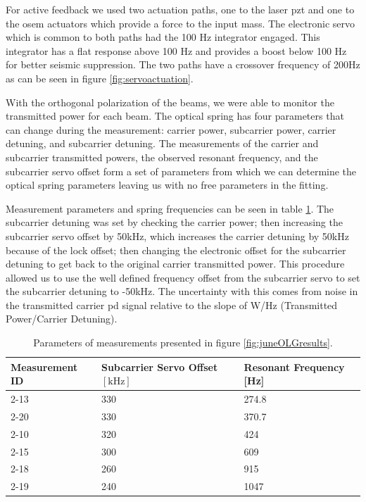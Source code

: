 For active feedback we used two actuation paths, one to the laser \ac{pzt} and
one to the \ac{osem} actuators which provide a force to the input mass.
The electronic servo which is common to both paths had the 100 Hz integrator
engaged.
This integrator has a flat response above 100 Hz and provides a boost below
100 Hz for better seismic suppression.
The two paths have a crossover frequency of 200Hz as can be seen in figure
\ref{fig:servoactuation}.


With the orthogonal polarization of the beams, we were able to monitor the
transmitted power for each beam.
The optical spring has four parameters that can change during the
measurement: carrier power, subcarrier power, carrier detuning, and subcarrier
detuning. The measurements of the carrier and subcarrier transmitted powers,
the observed resonant frequency, and the subcarrier servo offset form a set
of parameters from which we can determine the optical spring parameters leaving
us with no free parameters in the fitting.

Measurement parameters and spring frequencies can be seen in table
\ref{tab:experiment2params}.
The subcarrier detuning was set by checking the carrier power; then increasing
the subcarrier servo offset by 50kHz, which increases the carrier detuning by
50kHz because of the lock offset;
then changing the electronic offset for the subcarrier detuning to get back to
the original carrier transmitted power.
This procedure allowed us to use the well defined frequency offset from the
subcarrier servo to set the subcarrier detuning to -50kHz. The uncertainty
with this comes from noise in the transmitted carrier \ac{pd} signal relative
to the slope of W/Hz (Transmitted Power/Carrier Detuning).



\begin{table}
  \begin{center}
    \small
    \begin{tabular}{|l|l|l|}
      \hline
      Measurement ID & Subcarrier Servo Offset $[\mathrm{kHz}]$ & Resonant Frequency [Hz] \\
      \hline
      \hline
      2-13 & 330  & 274.8 \\
      2-20 & 330  & 370.7 \\
      2-10 & 320  & 424 \\
      2-15 & 300  & 609 \\
      2-18 & 260  & 915 \\
      2-19 & 240  & 1047 \\
      \hline
    \end{tabular}
  \end{center}
  \caption[Optical Trap, 2nd Edition Spring Measurements]{
      Parameters of measurements presented in figure \ref{fig:juneOLGresults}.
      }
  \label{tab:experiment2params}
\end{table}

